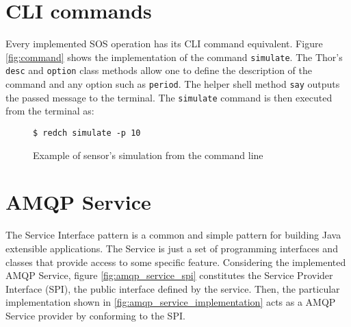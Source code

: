 \section{CLI commands}

Every implemented SOS operation has its CLI command equivalent. Figure \ref{fig:command} shows the implementation of the command \texttt{simulate}. The Thor's \texttt{desc} and \texttt{option} class methods allow one to define the description of the command and any option such as \texttt{period}. The helper shell method \texttt{say} outputs the passed message to the terminal. The \texttt{simulate} command is then executed from the terminal as:

\begin{figure}[H]
  \centering
  \texttt{\$ redch simulate -p 10}
  \caption{Example of sensor's simulation from the command line}
\end{figure}


\section{AMQP Service}

The Service Interface pattern is a common and simple pattern for building Java extensible applications. The Service is just a set of programming interfaces and classes that provide access to some specific feature. Considering the implemented AMQP Service, figure \ref{fig:amqp_service_spi} constitutes the Service Provider Interface (SPI), the public interface defined by the service. Then, the particular implementation shown in \ref{fig:amqp_service_implementation} acts as a AMQP Service provider by conforming to the SPI.

